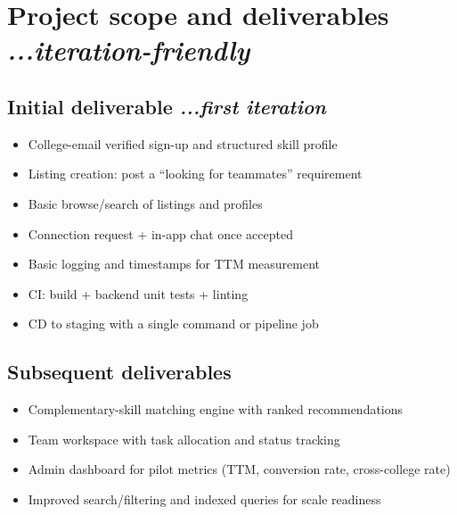 \documentclass[11pt]{article}
\begin{document}
\section{Project scope and deliverables \textit{...iteration-friendly}}
\subsection{Initial deliverable \textit{...first iteration}}
\begin{itemize}[leftmargin=*]
  \item College-email verified sign-up and structured skill profile
  \item Listing creation: post a ``looking for teammates'' requirement
  \item Basic browse/search of listings and profiles
  \item Connection request + in-app chat once accepted
  \item Basic logging and timestamps for TTM measurement
  \item CI: build + backend unit tests + linting
  \item CD to staging with a single command or pipeline job
\end{itemize}

\subsection{Subsequent deliverables}
\begin{itemize}[leftmargin=*]
  \item Complementary-skill matching engine with ranked recommendations
  \item Team workspace with task allocation and status tracking
  \item Admin dashboard for pilot metrics (TTM, conversion rate, cross-college rate)
  \item Improved search/filtering and indexed queries for scale readiness
\end{itemize}
\end{document}
